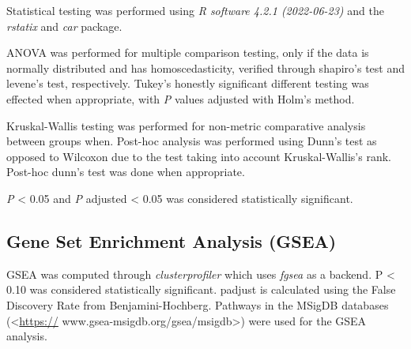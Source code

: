 \documentclass[
]{article}
\begin{document}
Statistical testing was performed using \emph{R software 4.2.1
(2022-06-23)} and the \emph{rstatix} and \emph{car} package.

ANOVA was performed for multiple comparison testing, only if the data is
normally distributed and has homoscedasticity, verified through
shapiro's test and levene's test, respectively. Tukey's honestly
significant different testing was effected when appropriate, with
\emph{P} values adjusted with Holm's method.

Kruskal-Wallis testing was performed for non-metric comparative analysis
between groups when. Post-hoc analysis was performed using Dunn's test
as opposed to Wilcoxon due to the test taking into account
Kruskal-Wallis's rank. Post-hoc dunn's test was done when appropriate.

\emph{P} \textless{} 0.05 and \emph{P} adjusted \textless{} 0.05 was
considered statistically significant.

\hypertarget{gene-set-enrichment-analysis-gsea}{%
\subsection{Gene Set Enrichment Analysis
(GSEA)}\label{gene-set-enrichment-analysis-gsea}}

GSEA was computed through \emph{clusterprofiler} which uses \emph{fgsea}
as a backend. P \textless{} 0.10 was considered statistically
significant. padjust is calculated using the False Discovery Rate from
Benjamini-Hochberg. Pathways in the MSigDB databases
(\textless{}\url{https://} www.gsea-msigdb.org/gsea/msigdb\textgreater)
were used for the GSEA analysis.

\newpage
\end{document}
